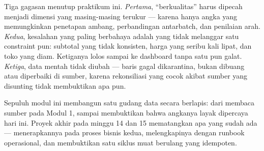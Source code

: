 Tiga gagasan menutup praktikum ini. \emph{Pertama}, ``berkualitas'' harus
dipecah menjadi dimensi yang masing-masing terukur --- karena hanya angka yang
memungkinkan penetapan ambang, perbandingan antarbatch, dan penilaian arah.
\emph{Kedua}, kesalahan yang paling berbahaya adalah yang tidak melanggar satu
constraint pun: subtotal yang tidak konsisten, harga yang seribu kali lipat,
dan toko yang diam. Ketiganya lolos sampai ke dashboard tanpa satu pun galat.
\emph{Ketiga}, data mentah tidak diubah --- baris gagal dikarantina, bukan
dibuang atau diperbaiki di sumber, karena rekonsiliasi yang cocok akibat sumber
yang disunting tidak membuktikan apa pun.

Sepuluh modul ini membangun satu gudang data secara berlapis: dari membaca
sumber pada Modul 1, sampai membuktikan bahwa angkanya layak dipercaya hari
ini. Proyek akhir pada minggu 14 dan 15 mematangkan apa yang sudah ada ---
menerapkannya pada proses bisnis kedua, melengkapinya dengan runbook
operasional, dan membuktikan satu siklus muat berulang yang idempoten.
